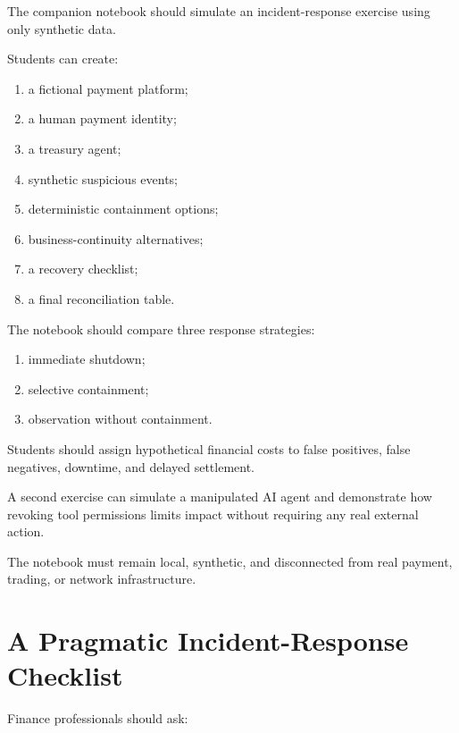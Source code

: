 \begin{notebooklab}
The companion notebook should simulate an incident-response exercise using only synthetic data.

Students can create:
\begin{enumerate}
    \item a fictional payment platform;
    \item a human payment identity;
    \item a treasury agent;
    \item synthetic suspicious events;
    \item deterministic containment options;
    \item business-continuity alternatives;
    \item a recovery checklist;
    \item a final reconciliation table.
\end{enumerate}

The notebook should compare three response strategies:
\begin{enumerate}
    \item immediate shutdown;
    \item selective containment;
    \item observation without containment.
\end{enumerate}

Students should assign hypothetical financial costs to false positives, false negatives, downtime, and delayed settlement.

A second exercise can simulate a manipulated AI agent and demonstrate how revoking tool permissions limits impact without requiring any real external action.

The notebook must remain local, synthetic, and disconnected from real payment, trading, or network infrastructure.
\end{notebooklab}

\section{A Pragmatic Incident-Response Checklist}

Finance professionals should ask:

